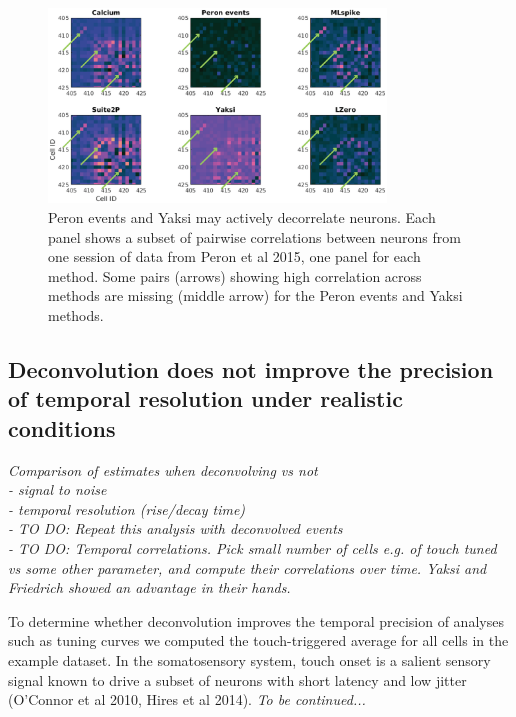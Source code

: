 \documentclass[a4paper]{article}
\begin{document}
\begin{figure}[h!]
\centering
\includegraphics[trim={50 10 50 10},clip,width=0.8\textwidth]{pcc_all_image2_zoom.eps}
\caption{\label{fig:PCC_example} Peron events and Yaksi may actively decorrelate neurons. Each panel shows a subset of pairwise correlations between neurons from one session of data from Peron et al 2015, one panel for each method. Some pairs (arrows) showing high correlation across methods are missing (middle arrow) for the Peron events and Yaksi methods.}
\end{figure}


\clearpage
\subsection*{Deconvolution does not improve the precision of temporal resolution under realistic conditions}
\emph{Comparison of estimates when deconvolving vs not\\
\indent - signal to noise \\
\indent - temporal resolution (rise/decay time)\\
\indent - TO DO: Repeat this analysis with deconvolved events\\
\indent - TO DO: Temporal correlations. Pick small number of cells e.g. of touch tuned vs some other parameter, and compute their correlations over time. Yaksi and Friedrich showed an advantage in their hands. \\}

To determine whether deconvolution improves the temporal precision of analyses such as tuning curves we computed the touch-triggered average for all cells in the example dataset. In the somatosensory system, touch onset is a salient sensory signal known to drive a subset of neurons with short latency and low jitter (O'Connor et al 2010, Hires et al 2014). \emph{To be continued...}
\end{document}
